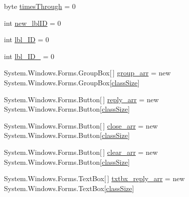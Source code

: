 \begin{DoxyCompactItemize}
\item 
byte \hyperlink{class_sr_p___classroom_inq_1_1frm_classrrom_inq_ab730336bf81938256d6f20922c15484b}{times\-Through} = 0
\item 
int \hyperlink{class_sr_p___classroom_inq_1_1frm_classrrom_inq_a561cfd5c0d34d4adcb14aee4efc01643}{new\-\_\-lbl\-I\-D} = 0
\item 
int \hyperlink{class_sr_p___classroom_inq_1_1frm_classrrom_inq_a15d44adc56e5e6523bfadd27d9966935}{lbl\-\_\-\-I\-D} = 0
\item 
int \hyperlink{class_sr_p___classroom_inq_1_1frm_classrrom_inq_a5d14fbec9e02ebe6942d26ae8ed53d3b}{lbl\-\_\-\-I\-D\-\_} = 0
\item 
\-System.\-Windows.\-Forms.\-Group\-Box\mbox{[}$\,$\mbox{]} \hyperlink{class_sr_p___classroom_inq_1_1frm_classrrom_inq_a68d2b307c87e71592f6e170c9ce2aad2}{group\-\_\-arr} = new \-System.\-Windows.\-Forms.\-Group\-Box\mbox{[}\hyperlink{class_sr_p___classroom_inq_1_1frm_classrrom_inq_a78d9aab335edfe53d39036b9d89928a8}{class\-Size}\mbox{]}
\item 
\-System.\-Windows.\-Forms.\-Button\mbox{[}$\,$\mbox{]} \hyperlink{class_sr_p___classroom_inq_1_1frm_classrrom_inq_a46ee30d934a5219840e4381a66728f0f}{reply\-\_\-arr} = new \-System.\-Windows.\-Forms.\-Button\mbox{[}\hyperlink{class_sr_p___classroom_inq_1_1frm_classrrom_inq_a78d9aab335edfe53d39036b9d89928a8}{class\-Size}\mbox{]}
\item 
\-System.\-Windows.\-Forms.\-Button\mbox{[}$\,$\mbox{]} \hyperlink{class_sr_p___classroom_inq_1_1frm_classrrom_inq_a4758f35d344b79b972e88a42cb660904}{close\-\_\-arr} = new \-System.\-Windows.\-Forms.\-Button\mbox{[}\hyperlink{class_sr_p___classroom_inq_1_1frm_classrrom_inq_a78d9aab335edfe53d39036b9d89928a8}{class\-Size}\mbox{]}
\item 
\-System.\-Windows.\-Forms.\-Button\mbox{[}$\,$\mbox{]} \hyperlink{class_sr_p___classroom_inq_1_1frm_classrrom_inq_a1c427c3d5bb61c96ca798e5f6aaff8f4}{clear\-\_\-arr} = new \-System.\-Windows.\-Forms.\-Button\mbox{[}\hyperlink{class_sr_p___classroom_inq_1_1frm_classrrom_inq_a78d9aab335edfe53d39036b9d89928a8}{class\-Size}\mbox{]}
\item 
\-System.\-Windows.\-Forms.\-Text\-Box\mbox{[}$\,$\mbox{]} \hyperlink{class_sr_p___classroom_inq_1_1frm_classrrom_inq_a3411157caafbe33c31a364fafd548afb}{txtbx\-\_\-reply\-\_\-arr} = new \-System.\-Windows.\-Forms.\-Text\-Box\mbox{[}\hyperlink{class_sr_p___classroom_inq_1_1frm_classrrom_inq_a78d9aab335edfe53d39036b9d89928a8}{class\-Size}\mbox{]}
\item 

\end{DoxyCompactItemize}
